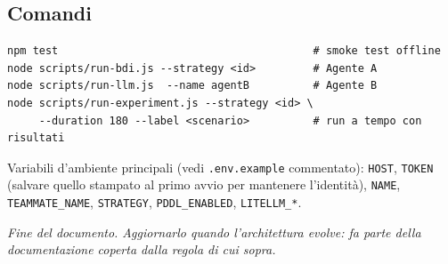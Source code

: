 \documentclass[11pt,a4paper]{article}
\newcommand{\file}[1]{\texttt{#1}}
\newcommand{\code}[1]{\texttt{#1}}
\begin{document}
\subsection{Comandi}

\begin{lstlisting}[language={}]
npm test                                        # smoke test offline
node scripts/run-bdi.js --strategy <id>         # Agente A
node scripts/run-llm.js  --name agentB          # Agente B
node scripts/run-experiment.js --strategy <id> \
     --duration 180 --label <scenario>          # run a tempo con risultati
\end{lstlisting}

Variabili d'ambiente principali (vedi \file{.env.example} commentato):
\code{HOST}, \code{TOKEN} (salvare quello stampato al primo avvio per
mantenere l'identità), \code{NAME}, \code{TEAMMATE\_NAME},
\code{STRATEGY}, \code{PDDL\_ENABLED}, \code{LITELLM\_*}.

\bigskip
\noindent\textit{Fine del documento. Aggiornarlo quando l'architettura
evolve: fa parte della documentazione coperta dalla regola di cui sopra.}
\end{document}
